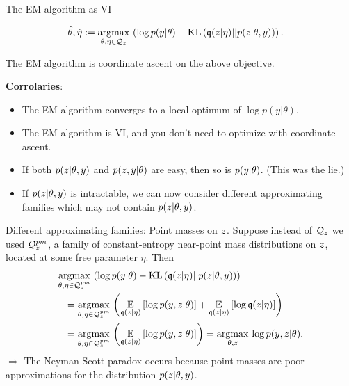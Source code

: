 \begin{frame}{The EM algorithm as VI}

\begin{align*}
%
\thetahat, \etaopt :={}& \argmax{\theta, \eta \in \qdom_z} \left(
\log p(\y | \theta) -
    \kl{\q(\z | \eta)}{p(\z | \theta, \y)}  \right).
%
\end{align*}
%

The EM algorithm is coordinate ascent on the above objective.

\textbf{Corrolaries}:

\begin{itemize}
%
\item The EM algorithm converges to a local optimum of $\log p(y | \theta)$.
%
\item The EM algorithm is VI, and you don't need to optimize with coordinate
ascent.
%
\item If both $p(z | \theta, y)$ and $p(z, y | \theta )$ are easy,
then so is $p(y | \theta)$.  (This was the lie.)
%
\item If $p(z | \theta, y)$ is intractable, we can now consider different
approximating families which may not contain $p(z | \theta, y)$.
%
\end{itemize}

\end{frame}



\begin{frame}{Different approximating families: Point masses on $z$.}
%
Suppose instead of $\mathcal{Q}_z$ we used $\mathcal{Q}_{z}^{pm}$, a family of
constant-entropy near-point mass distributions on $z$, located at
some free parameter $\eta$.  Then
%
\begin{align*}
%
\MoveEqLeft
\argmax{\theta, \eta \in \qdom_{\z}^{pm}}
\left(
\log p(\y | \theta) -
    \kl{\q(\z | \eta)}{p(\z | \theta, \y)}  \right)
\\={}&
\argmax{\theta, \eta \in \qdom_{\z}^{pm}}
\left(
\expect{\q(\z | \eta)}{
    \log p(\y, \z | \theta) }
+ \expect{\q(\z | \eta)}{\log \q(\z | \eta)
}\right)
\\={}&
\argmax{\theta, \eta \in \qdom_{\z}^{pm}}
\left(
\expect{\q(\z | \eta)}{
    \log p(\y, \z | \theta) }
\right)
={}
\argmax{\theta, \z}
    \log p(\y, \z | \theta).
%
\end{align*}
%
$\Rightarrow$ The Neyman-Scott paradox occurs because point masses are
poor approximations for the distribution $p(z | \theta, y)$.

\end{frame}

